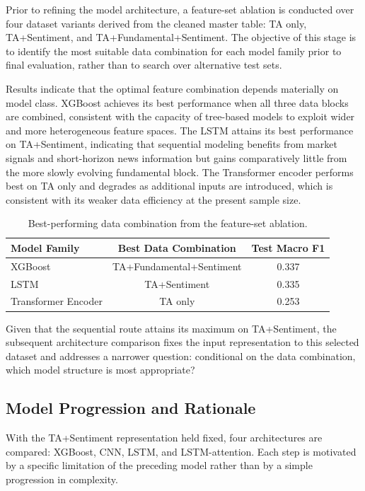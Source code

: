 \documentclass[12pt]{article}
\begin{document}
Prior to refining the model architecture, a feature-set ablation is conducted over four dataset variants derived from the cleaned master table: TA only, TA+Sentiment, and TA+Fundamental+Sentiment. The objective of this stage is to identify the most suitable data combination for each model family prior to final evaluation, rather than to search over alternative test sets.

Results indicate that the optimal feature combination depends materially on model class. XGBoost achieves its best performance when all three data blocks are combined, consistent with the capacity of tree-based models to exploit wider and more heterogeneous feature spaces. The LSTM attains its best performance on TA+Sentiment, indicating that sequential modeling benefits from market signals and short-horizon news information but gains comparatively little from the more slowly evolving fundamental block. The Transformer encoder performs best on TA only and degrades as additional inputs are introduced, which is consistent with its weaker data efficiency at the present sample size.

\begin{table}[H]
    \centering
    \small
    \begin{tabular}{lcc}
        \toprule
        Model Family & Best Data Combination & Test Macro F1 \\
        \midrule
        XGBoost & TA+Fundamental+Sentiment & 0.337 \\
        LSTM & TA+Sentiment & 0.335 \\
        Transformer Encoder & TA only & 0.253 \\
        \bottomrule
    \end{tabular}
    \caption{Best-performing data combination from the feature-set ablation.}
\end{table}

Given that the sequential route attains its maximum on TA+Sentiment, the subsequent architecture comparison fixes the input representation to this selected dataset and addresses a narrower question: conditional on the data combination, which model structure is most appropriate?

\subsection{Model Progression and Rationale}

With the TA+Sentiment representation held fixed, four architectures are compared: XGBoost, CNN, LSTM, and LSTM-attention. Each step is motivated by a specific limitation of the preceding model rather than by a simple progression in complexity.
\end{document}

